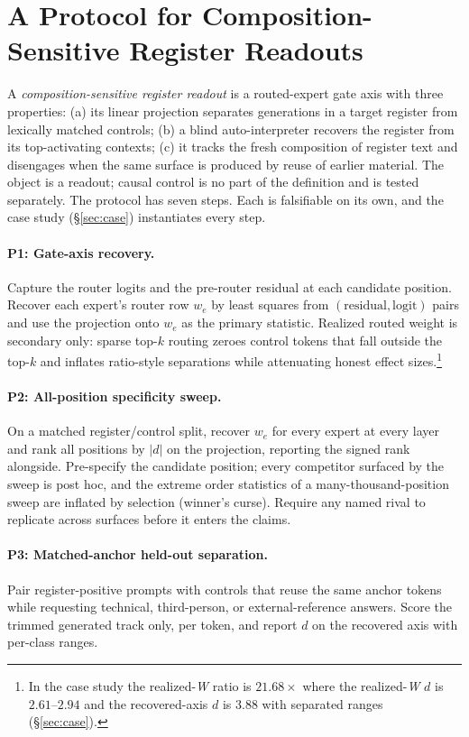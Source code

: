 \documentclass[10pt,a4paper,twocolumn]{article}
\newcommand{\W}{\textit{W}}
\begin{document}
\section{A Protocol for Composition-Sensitive Register Readouts}\label{sec:protocol}

A \emph{composition-sensitive register readout} is a routed-expert gate axis
with three properties: (a) its linear projection separates generations in a
target register from lexically matched controls; (b) a blind auto-interpreter
recovers the register from its top-activating contexts; (c) it tracks the
fresh composition of register text and disengages when the same surface is
produced by reuse of earlier material. The object is a readout; causal
control is no part of the definition and is tested separately. The protocol
has seven steps. Each is falsifiable on its own, and the case study
(\S\ref{sec:case}) instantiates every step.

\paragraph{P1: Gate-axis recovery.} Capture the router logits and the
pre-router residual at each candidate position. Recover each expert's router
row $w_e$ by least squares from $(\text{residual}, \text{logit})$ pairs and
use the projection onto $w_e$ as the primary statistic. Realized routed
weight is secondary only: sparse top-$k$ routing zeroes control tokens that
fall outside the top-$k$ and inflates ratio-style separations while
attenuating honest effect sizes.\footnote{In the case study the realized-\W{}
ratio is $21.68\times$ where the realized-\W{} $d$ is $2.61$--$2.94$ and the
recovered-axis $d$ is $3.88$ with separated ranges (\S\ref{sec:case}).}

\paragraph{P2: All-position specificity sweep.} On a matched register/control
split, recover $w_e$ for every expert at every layer and rank all positions by
$|d|$ on the projection, reporting the signed rank alongside. Pre-specify the
candidate position; every competitor surfaced by the sweep is post hoc, and
the extreme order statistics of a many-thousand-position sweep are inflated
by selection (winner's curse). Require any named rival to replicate across
surfaces before it enters the claims.

\paragraph{P3: Matched-anchor held-out separation.} Pair register-positive
prompts with controls that reuse the same anchor tokens while requesting
technical, third-person, or external-reference answers. Score the trimmed
generated track only, per token, and report $d$ on the recovered axis with
per-class ranges.
\end{document}
